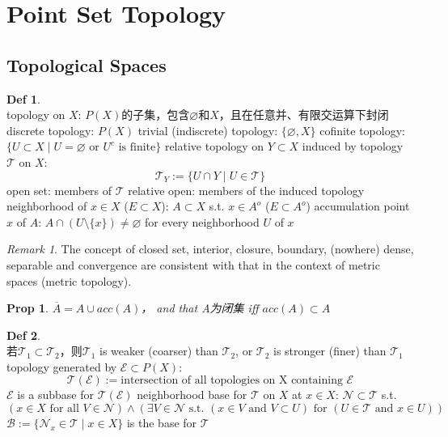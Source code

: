 \documentclass[hidelinks]{article}
\theoremstyle{definition}
\newtheorem*{defin}{Def}
\theoremstyle{plain}
\newtheorem{proposition}[theorem]{Prop}
\theoremstyle{remark}
\newtheorem*{remark}{Remark}
\begin{document}
\section{Point Set Topology}

\subsection{Topological Spaces}
\begin{defin}~\\
topology on $X$: $P(X)$的子集，包含$\varnothing$和$X$，且在任意并、有限交运算下封闭 \newline
discrete topology: $P(X)$ \newline
trivial (indiscrete) topology: $\{\varnothing,X\}$ \newline
cofinite topology: $\{U\subset X\mid U=\varnothing \textrm{ or } U^c \textrm{ is finite}\}$ \newline
relative topology on $Y\subset X$ induced by topology $\mathscr{T}$ on $X$:
$$\mathscr{T}_Y:=\{U\cap Y\mid U\in \mathscr{T}\}$$
open set: members of $\mathscr{T}$ \newline
relative open: members of the induced topology \newline
neighborhood of $x\in X$ ($E\subset X$): $A\subset X$ s.t. $x\in A^o$ ($E\subset A^o$) \newline
accumulation point $x$ of $A$: $A\cap (U\setminus\{x\})\neq \varnothing$ for every neighborhood $U$ of $x$
\end{defin}

\begin{remark}
The concept of closed set, interior, closure, boundary, (nowhere) dense, separable and convergence are consistent with that in the context of metric spaces (metric topology).
\end{remark}

\begin{proposition}
$\overline{A}=A\cup acc(A)$， and that A为闭集 \textrm{iff} $acc(A)\subset A$
\end{proposition}

\begin{defin}~\\
若$\mathscr{T}_1\subset\mathscr{T}_2$，则$\mathscr{T}_1$ is weaker (coarser) than $\mathscr{T}_2$, or $\mathscr{T}_2$ is stronger (finer) than $\mathscr{T}_1$ \newline
topology generated by $\mathscr{E}\subset P(X)$:
$$\mathscr{T}(\mathscr{E}):= \textrm{intersection of all topologies on X containing }\mathscr{E}$$
$\mathscr{E}$ is a subbase for $\mathscr{T}(\mathscr{E})$ \newline
neighborhood base for $\mathscr{T}$ on $X$ at $x\in X$: $\mathscr{N}\subset \mathscr{T}$ s.t.
$$(x\in X \textrm{ for all } V\in \mathscr{N})\wedge(\exists V\in \mathscr{N} \textrm{ s.t. }(x\in V \textrm{ and } V\subset U)\textrm{ for }(U\in \mathscr{T} \textrm{ and } x\in U))$$
$\mathscr{B}:=\{\mathscr{N}_x\in \mathscr{T}\mid x\in X\}$ is the base for $\mathscr{T}$
\end{defin}
\end{document}
